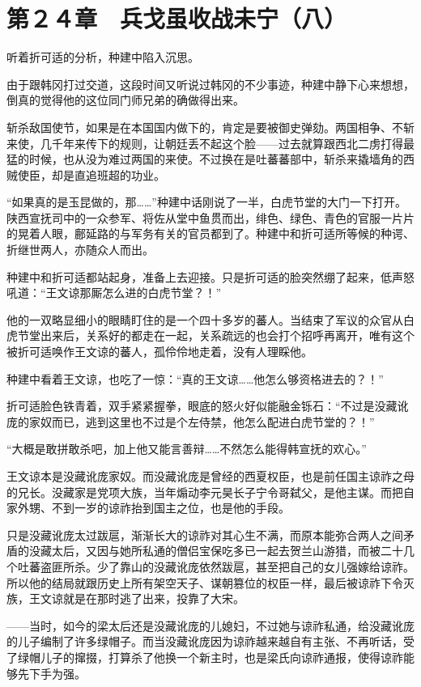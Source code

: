 \section{第２４章　兵戈虽收战未宁（八）}

听着折可适的分析，种建中陷入沉思。

由于跟韩冈打过交道，这段时间又听说过韩冈的不少事迹，种建中静下心来想想，倒真的觉得他的这位同门师兄弟的确做得出来。

斩杀敌国使节，如果是在本国国内做下的，肯定是要被御史弹劾。两国相争、不斩来使，几千年来传下的规则，让朝廷丢不起这个脸——过去就算跟西北二虏打得最猛的时候，也从没为难过两国的来使。不过换在是吐蕃蕃部中，斩杀来撬墙角的西贼使臣，却是直追班超的功业。

“如果真的是玉昆做的，那……”种建中话刚说了一半，白虎节堂的大门一下打开。陕西宣抚司中的一众参军、将佐从堂中鱼贯而出，绯色、绿色、青色的官服一片片的晃着人眼，鄜延路的与军务有关的官员都到了。种建中和折可适所等候的种谔、折继世两人，亦随众人而出。

种建中和折可适都站起身，准备上去迎接。只是折可适的脸突然绷了起来，低声怒吼道：“王文谅那厮怎么进的白虎节堂？！”

他的一双略显细小的眼睛盯住的是一个四十多岁的蕃人。当结束了军议的众官从白虎节堂出来后，关系好的都走在一起，关系疏远的也会打个招呼再离开，唯有这个被折可适唤作王文谅的蕃人，孤伶伶地走着，没有人理睬他。

种建中看着王文谅，也吃了一惊：“真的王文谅……他怎么够资格进去的？！”

折可适脸色铁青着，双手紧紧握拳，眼底的怒火好似能融金铄石：“不过是没藏讹庞的家奴而已，逃到这里也不过是个左侍禁，他怎么配进白虎节堂的？！”

“大概是敢拼敢杀吧，加上他又能言善辩……不然怎么能得韩宣抚的欢心。”

王文谅本是没藏讹庞家奴。而没藏讹庞是曾经的西夏权臣，也是前任国主谅祚之母的兄长。没藏家是党项大族，当年煽动李元昊长子宁令哥弑父，是他主谋。而把自家外甥、不到一岁的谅祚抬到国主之位，也是他的手段。

只是没藏讹庞太过跋扈，渐渐长大的谅祚对其心生不满，而原本能弥合两人之间矛盾的没藏太后，又因与她所私通的僧侣宝保吃多已一起去贺兰山游猎，而被二十几个吐蕃盗匪所杀。少了靠山的没藏讹庞依然跋扈，甚至把自己的女儿强嫁给谅祚。所以他的结局就跟历史上所有架空天子、谋朝篡位的权臣一样，最后被谅祚下令灭族，王文谅就是在那时逃了出来，投靠了大宋。

——当时，如今的梁太后还是没藏讹庞的儿媳妇，不过她与谅祚私通，给没藏讹庞的儿子编制了许多绿帽子。而当没藏讹庞因为谅祚越来越自有主张、不再听话，受了绿帽儿子的撺掇，打算杀了他换一个新主时，也是梁氏向谅祚通报，使得谅祚能够先下手为强。

